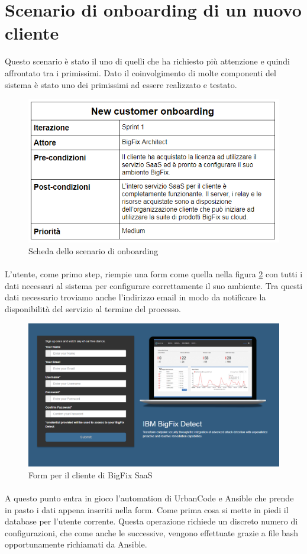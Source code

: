 \section{Scenario di onboarding di un nuovo cliente}
Questo scenario è stato il uno di quelli che ha richiesto più attenzione e quindi affrontato tra i primissimi. Dato il coinvolgimento di molte componenti del sistema è stato uno dei primissimi ad essere realizzato e testato. 
\begin{figure}
	\centering
	\includegraphics[width=0.7\linewidth]{capitoli/imgs/onbordingScenarioScheda}
	\caption{Scheda dello scenario di onboarding}
	\label{fig:onbordingscenarioscheda}
\end{figure}
\paragraph{}
L'utente, come primo step, riempie una form come quella nella figura \ref{fig:saasform} con tutti i dati necessari al sistema per configurare correttamente il suo ambiente. Tra questi dati necessario troviamo anche l'indirizzo email in modo da notificare la disponibilità del servizio al termine del processo. 
\begin{figure}
	\centering
	\includegraphics[width=0.7\linewidth]{capitoli/imgs/saasForm}
	\caption{Form per il cliente di BigFix SaaS}
	\label{fig:saasform}
\end{figure}
\paragraph{}
A questo punto entra in gioco l'automation di UrbanCode e Ansible che prende in pasto i dati appena inseriti nella form. Come prima cosa si mette in piedi il database per l'utente corrente. Questa operazione richiede un discreto numero di configurazioni, che come anche le successive, vengono effettuate grazie a file bash opportunamente richiamati da Ansible. 

